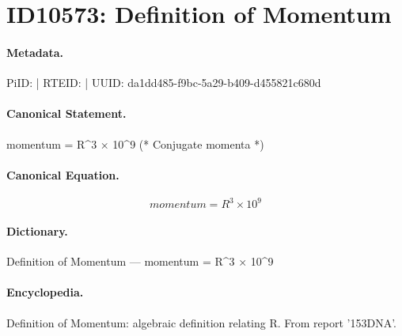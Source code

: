 \section*{ID10573: Definition of Momentum}
\paragraph{Metadata.}
PiID:  | RTEID:  | UUID: da1dd485-f9bc-5a29-b409-d455821c680d

\paragraph{Canonical Statement.}
momentum = R\textasciicircum{}3 × 10\textasciicircum{}9 (* Conjugate momenta *)

\paragraph{Canonical Equation.}
\[
momentum = R^3 × 10^9
\]

\paragraph{Dictionary.}
Definition of Momentum — momentum = R\textasciicircum{}3 × 10\textasciicircum{}9

\paragraph{Encyclopedia.}
Definition of Momentum: algebraic definition relating R. From report '153DNA'.
